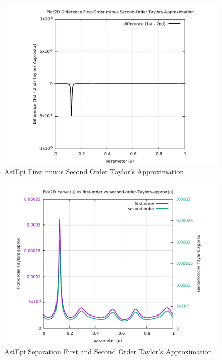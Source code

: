 \begin{figure}
	\caption     {AstEpi First minus Second Order Taylor's Approximation}
	\label{06-img-AstEpi-First-minus-Second-Order-Taylors-Approx.pdf}
\includegraphics[width=1.00\textwidth]{Chap4/appendix/app-AstEpi/plots/06-img-AstEpi-First-minus-Second-Order-Taylors-Approx.pdf}
\end{figure}

\clearpage
\pagebreak

\begin{figure}
	\caption     {AstEpi Separation First and Second Order Taylor's Approximation}
	\label{07-img-AstEpi-Separation-First-and-Second-Order-Taylors-Approx.pdf}
\includegraphics[width=1.00\textwidth]{Chap4/appendix/app-AstEpi/plots/07-img-AstEpi-First-and-Second-Order-Taylors-Approx.pdf}
\end{figure}


